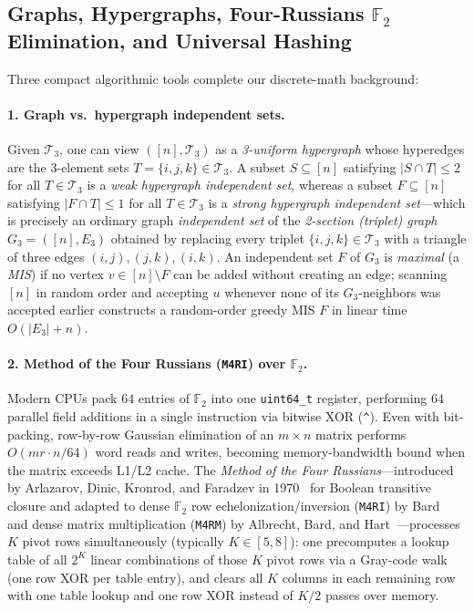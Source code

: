 \documentclass[12pt]{article}
\theoremstyle{definition}
\newcommand{\Ftwo}{\mathbb{F}_2}
\newcommand{\Tc}{\mathcal{T}_3}
\newcommand{\ttt}[1]{\texttt{#1}}
\begin{document}
\subsection{Graphs, Hypergraphs, Four-Russians \texorpdfstring{$\Ftwo$}{GF(2)} Elimination, and Universal
  Hashing}\label{subsec:alg_bg}

Three compact algorithmic tools complete our discrete-math background:

\paragraph{1. Graph vs.\ hypergraph independent sets.}
Given $\Tc$, one can view $([n], \Tc)$ as a \emph{3-uniform hypergraph} whose hyperedges are the 3-element sets $T
= \{i, j, k\} \in \Tc$. A subset $S \subseteq [n]$ satisfying $|S \cap T| \le 2$ for all $T \in \Tc$ is a
\emph{weak hypergraph independent set}, whereas a subset $F \subseteq [n]$ satisfying $|F \cap T| \le 1$ for all $T
\in \Tc$ is a \emph{strong hypergraph independent set}---which is precisely an ordinary graph \emph{independent
set} of the \emph{2-section (triplet) graph} $G_3 = ([n], E_3)$ obtained by replacing every triplet $\{i, j, k\}
\in \Tc$ with a triangle of three edges $(i, j), (j, k), (i, k)$. An independent set $F$ of $G_3$ is
\emph{maximal} (a \emph{MIS}) if no vertex $v \in [n] \setminus F$ can be added without creating an edge; scanning
$[n]$ in random order and accepting $u$ whenever none of its $G_3$-neighbors was accepted earlier constructs a
random-order greedy MIS $F$ in linear time $O(|E_3| + n)$.

\paragraph{2. Method of the Four Russians (\ttt{M4RI}) over $\Ftwo$.}
Modern CPUs pack $64$ entries of $\Ftwo$ into one \ttt{uint64\_t} register, performing $64$ parallel field
additions in a single instruction via bitwise XOR (\ttt{\^{}}). Even with bit-packing, row-by-row Gaussian
elimination of an $m \times n$ matrix performs $O(m r \cdot n/64)$ word reads and writes, becoming
memory-bandwidth bound when the matrix exceeds L1/L2 cache. The \emph{Method of the Four Russians}---introduced by
Arlazarov, Dinic, Kronrod, and Faradzev in 1970~\cite{Arlazarov1970} for Boolean transitive closure and adapted to
dense $\Ftwo$ row echelonization/inversion (\ttt{M4RI}) by Bard~\cite{Bard2006} and dense matrix multiplication
(\ttt{M4RM}) by Albrecht, Bard, and Hart~\cite{AlbrechtBardHart2010}---processes $K$ pivot rows simultaneously
(typically $K \in [5, 8]$): one precomputes a lookup table of all $2^K$ linear combinations of those $K$ pivot rows
via a Gray-code walk (one row XOR per table entry), and clears all $K$ columns in each remaining row with one table
lookup and one row XOR instead of $K/2$ passes over memory.
\end{document}
